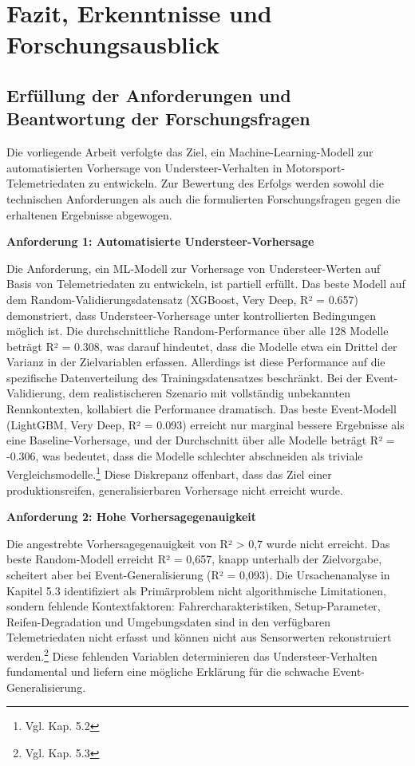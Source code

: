 \chapter{Fazit, Erkenntnisse und Forschungsausblick}

\section{Erfüllung der Anforderungen und Beantwortung der Forschungsfragen}

Die vorliegende Arbeit verfolgte das Ziel, ein Machine-Learning-Modell zur automatisierten Vorhersage von Understeer-Verhalten in Motorsport-Telemetriedaten zu entwickeln. Zur Bewertung des Erfolgs werden sowohl die technischen Anforderungen als auch die formulierten Forschungsfragen gegen die erhaltenen Ergebnisse abgewogen.

\textbf{Anforderung 1: Automatisierte Understeer-Vorhersage}

Die Anforderung, ein ML-Modell zur Vorhersage von Understeer-Werten auf Basis von Telemetriedaten zu entwickeln, ist partiell erfüllt. Das beste Modell auf dem Random-Validierungsdatensatz (XGBoost, Very Deep, R² = 0.657) demonstriert, dass Understeer-Vorhersage unter kontrollierten Bedingungen möglich ist. Die durchschnittliche Random-Performance über alle 128 Modelle beträgt R² = 0.308, was darauf hindeutet, dass die Modelle etwa ein Drittel der Varianz in der Zielvariablen erfassen. Allerdings ist diese Performance auf die spezifische Datenverteilung des Trainingsdatensatzes beschränkt. Bei der Event-Validierung, dem realistischeren Szenario mit vollständig unbekannten Rennkontexten, kollabiert die Performance dramatisch. Das beste Event-Modell (LightGBM, Very Deep, R² = 0.093) erreicht nur marginal bessere Ergebnisse als eine Baseline-Vorhersage, und der Durchschnitt über alle Modelle beträgt R² = -0.306, was bedeutet, dass die Modelle schlechter abschneiden als triviale Vergleichsmodelle.\footnote{Vgl. Kap. 5.2} Diese Diskrepanz offenbart, dass das Ziel einer produktionsreifen, generalisierbaren Vorhersage nicht erreicht wurde.

\textbf{Anforderung 2: Hohe Vorhersagegenauigkeit}

Die angestrebte Vorhersagegenauigkeit von R² > 0,7 wurde nicht erreicht. Das beste Random-Modell erreicht R² = 0,657, knapp unterhalb der Zielvorgabe, scheitert aber bei Event-Generalisierung (R² = 0,093). Die Ursachenanalyse in Kapitel 5.3 identifiziert als Primärproblem nicht algorithmische Limitationen, sondern fehlende Kontextfaktoren: Fahrercharakteristiken, Setup-Parameter, Reifen-Degradation und Umgebungsdaten sind in den verfügbaren Telemetriedaten nicht erfasst und können nicht aus Sensorwerten rekonstruiert werden.\footnote{Vgl. Kap. 5.3} Diese fehlenden Variablen determinieren das Understeer-Verhalten fundamental und liefern eine mögliche Erklärung für die schwache Event-Generalisierung.



